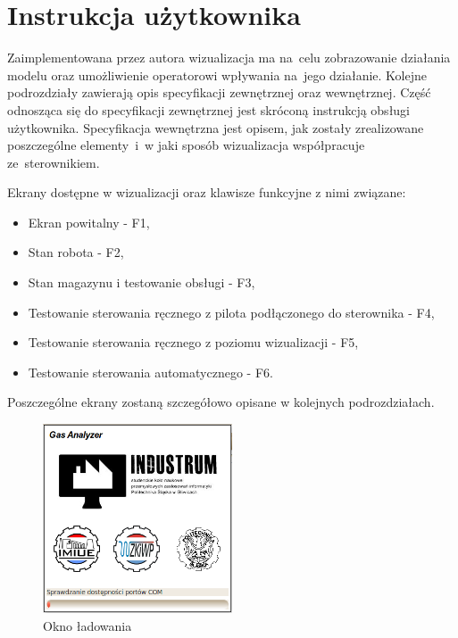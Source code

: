 \section{Instrukcja użytkownika}
Zaimplementowana przez autora wizualizacja ma na~celu zobrazowanie działania modelu oraz umożliwienie operatorowi wpływania na~jego działanie. Kolejne podrozdziały zawierają opis specyfikacji zewnętrznej oraz wewnętrznej. Część odnosząca się do specyfikacji zewnętrznej jest skróconą instrukcją obsługi użytkownika. Specyfikacja wewnętrzna jest opisem, jak zostały zrealizowane poszczególne elementy~i~w jaki sposób wizualizacja współpracuje ze~sterownikiem.

Ekrany dostępne w wizualizacji oraz klawisze funkcyjne z nimi związane:
\begin{itemize} 
\item Ekran powitalny - F1,
\item Stan robota - F2,
\item Stan magazynu i testowanie obsługi - F3,
\item Testowanie sterowania ręcznego z pilota podłączonego do sterownika - F4,
\item Testowanie sterowania ręcznego z poziomu wizualizacji - F5,
\item Testowanie sterowania automatycznego - F6.
\end{itemize}
\indent
\indent Poszczególne ekrany zostaną szczegółowo opisane w kolejnych podrozdziałach.

\begin{figure}[!htb] 	\centering 	\includegraphics[width=0.5\textwidth]{images/splashScreen.png} \caption{Okno ładowania} \label{template} \end{figure}

